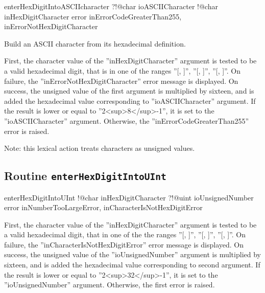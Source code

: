 {\begin{galgascode}
enterHexDigitIntoASCIIcharacter ?!@char ioASCIICharacter
                                !@char inHexDigitCharacter
                                error inErrorCodeGreaterThan255,
                                      inErrorNotHexDigitCharacter
\end{galgascode}

Build an ASCII character from its hexadecimal definition.

First, the character value of the ''inHexDigitCharacter'' argument is tested to be a valid hexadecimal digit, that is in one of the ranges ''[\textquotesingle, \textquotesingle]'', ''[\textquotesingle, \textquotesingle]'', ''[\textquotesingle, \textquotesingle]''. On failure, the ''inErrorNotHexDigitCharacter'' error message is displayed. On success, the unsigned value of the first argument is multiplied by sixteen, and is added the hexadecimal value corresponding to ''ioASCIICharacter'' argument. If the result is lower or equal to ''2<sup>8</sup>-1'', it is set to the ''ioASCIICharacter'' argument. Otherwise, the ''inErrorCodeGreaterThan255'' error is raised.

Note: this lexical action treats characters as unsigned values.

\subsection{Routine \texttt{enterHexDigitIntoUInt}}

\begin{galgascode}
enterHexDigitIntoUInt !@char inHexDigitCharacter
                      ?!@uint ioUnsignedNumber
                      error inNumberTooLargeError,
                            inCharacterIsNotHexDigitError
\end{galgascode}

First, the character value of the ''inHexDigitCharacter'' argument is tested to be a valid hexadecimal digit, that in one of the the ranges ''[\textquotesingle, \textquotesingle]'', ''[\textquotesingle, \textquotesingle]'', ''[\textquotesingle, \textquotesingle]''. On failure, the ''inCharacterIsNotHexDigitError'' error message is displayed. On success, the unsigned value of the ''ioUnsignedNumber'' argument is multiplied by sixteen, and is added the hexadecimal value corresponding to second argument. If the result is lower or equal to ''2<sup>32</sup>-1'', it is set to the ''ioUnsignedNumber'' argument. Otherwise, the first error is raised.

}
